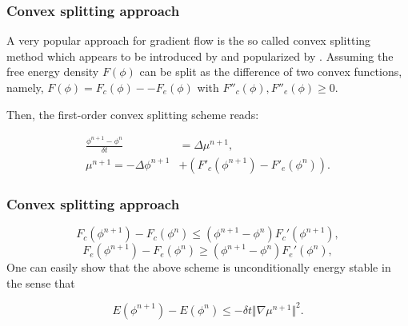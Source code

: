 \documentclass{beamer}
\begin{document}
    \begin{frame}
    \frametitle{Convex splitting approach}

A very popular approach for gradient flow is the so called convex splitting method which appears to be introduced by \cite{doi:10.1137/0730084} and popularized by \cite{Eyre199839}. Assuming the free energy density $F(\phi)$ can be split as the difference of two convex functions, namely, $F(\phi)=F_c(\phi)-−F_e(\phi)$ with $F''_c(\phi), F''_e(\phi)\geq 0.$

 Then, the first-order convex splitting scheme reads:

\begin{equation}\label{Convex}
  \begin{split}
     \frac{\phi^{n+1}-\phi^n}{\delta t}&=\Delta \mu^{n+1},\\
     \mu^{n+1} = -\Delta\phi^{n+1}&+(F'_c(\phi^{n+1})-F'_e(\phi^n)).
  \end{split}
\end{equation}

    \end{frame}
    \begin{frame}
    \frametitle{Convex splitting approach}
    $$
    F_c(\phi^{n+1})-F_c(\phi^n)\leq(\phi^{n+1}-\phi^n)F_c'(\phi^{n+1}),
    $$
    $$
    F_e(\phi^{n+1})-F_e(\phi^n)\geq(\phi^{n+1}-\phi^n)F_e'(\phi^{n}),
    $$
One can easily show that the above scheme is unconditionally energy stable in the sense that

$$
E(\phi^{n+1})-E(\phi^n)\leq -\delta t \Vert\nabla\mu^{n+1}\Vert^2.
$$



    \end{frame}
\end{document}
